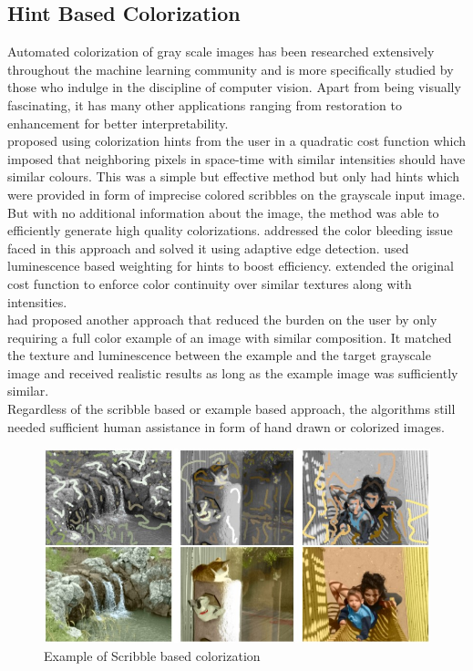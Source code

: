 \documentclass[12pt, letterpaper]{article}
\begin{document}
	\subsection{Hint Based Colorization}
		\hspace*{0.25 in} Automated colorization of gray scale images has been researched extensively throughout the machine learning community and is more specifically studied by those who indulge in the discipline of computer vision. Apart from being visually fascinating, it has many other applications ranging from restoration to enhancement for better interpretability.\\
		\hspace*{0.25 in}\cite{levin2004colorization} proposed using colorization hints from the user in a quadratic cost function which imposed that neighboring pixels in space-time with similar intensities should have similar colours. This was a simple but effective method but only had hints which were provided in form of imprecise colored scribbles on the grayscale input image. But with no additional information about the image, the method was able to efficiently generate high quality colorizations. \cite{huang2005edge} addressed the color bleeding issue faced in this approach and solved it using adaptive edge detection. \cite{yatziv2006chrominance} used luminescence based weighting for hints to boost efficiency. \cite{qu2006manga} extended the original cost function to enforce color continuity over similar textures along with intensities.\\
		\hspace*{0.25 in}\cite{welsh2002color} had proposed another approach that reduced the burden on the user by only requiring a full color example of an image with similar composition. It matched the texture and luminescence between the example and the target grayscale image and received realistic results as long as the example image was sufficiently similar.\\
		\hspace*{0.25 in}Regardless of the scribble based or example based approach, the algorithms still needed sufficient human assistance in form of hand drawn or colorized images.
		\begin{figure}
		\includegraphics[width=\textwidth]{levin_scribble_based_colorization_example.jpg}
		\caption{Example of Scribble based colorization \citep{levin2004colorization}}
		\label{fig: levin_example}
		\end{figure}
\end{document}
